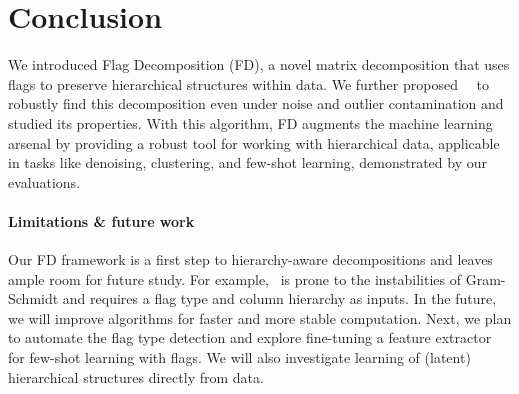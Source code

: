 \vspace{-3mm}\section{Conclusion}\label{sec:conclusion}

We introduced Flag Decomposition (FD), a novel matrix decomposition that uses flags to preserve hierarchical structures within data. We further proposed~\algname~
to robustly find this decomposition even under noise and outlier contamination and studied its 
properties. With this algorithm, FD augments the machine learning arsenal by providing a robust tool for working with hierarchical data, applicable in tasks like denoising, clustering, and few-shot learning, demonstrated by our evaluations. 


\paragraph{Limitations \& future work} 
Our FD framework is a first step to hierarchy-aware decompositions and leaves ample room for future study. For example, \algname~is prone to the instabilities of Gram-Schmidt and requires a flag type and column hierarchy as inputs. In the future, we will improve algorithms for faster and more stable computation. Next, we plan to automate the flag type detection and explore fine-tuning a feature extractor for few-shot learning with flags. We will also investigate learning of (latent) hierarchical structures directly from data.